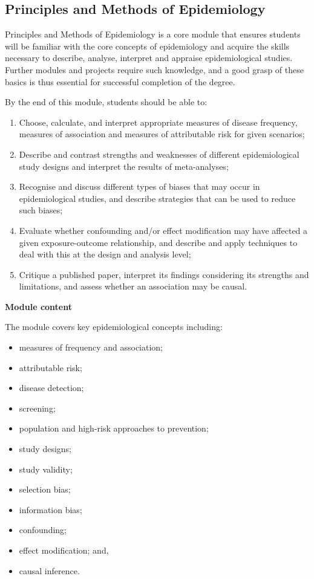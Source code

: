 \documentclass[
]{book}
\providecommand{\tightlist}{%
  \setlength{\itemsep}{0pt}\setlength{\parskip}{0pt}}
\begin{document}
\subsection*{Principles and Methods of Epidemiology}\label{principles-and-methods-of-epidemiology}

Principles and Methods of Epidemiology is a core module that ensures students will be familiar with the core concepts of epidemiology and acquire the skills necessary to describe, analyse, interpret and appraise epidemiological studies. Further modules and projects require such knowledge, and a good grasp of these basics is thus essential for successful completion of the degree.

By the end of this module, students should be able to:

\begin{enumerate}
\def\labelenumi{\arabic{enumi}.}
\tightlist
\item
  Choose, calculate, and interpret appropriate measures of disease frequency, measures of association and measures of attributable risk for given scenarios;
\item
  Describe and contrast strengths and weaknesses of different epidemiological study designs and interpret the results of meta-analyses;
\item
  Recognise and discuss different types of biases that may occur in epidemiological studies, and describe strategies that can be used to reduce such biases;
\item
  Evaluate whether confounding and/or effect modification may have affected a given exposure-outcome relationship, and describe and apply techniques to deal with this at the design and analysis level;
\item
  Critique a published paper, interpret its findings considering its strengths and limitations, and assess whether an association may be causal.
\end{enumerate}

\textbf{Module content}

The module covers key epidemiological concepts including:

\begin{itemize}
\tightlist
\item
  measures of frequency and association;
\item
  attributable risk;
\item
  disease detection;
\item
  screening;
\item
  population and high-risk approaches to prevention;
\item
  study designs;
\item
  study validity;
\item
  selection bias;
\item
  information bias;
\item
  confounding;
\item
  effect modification; and,
\item
  causal inference.
\end{itemize}
\end{document}
